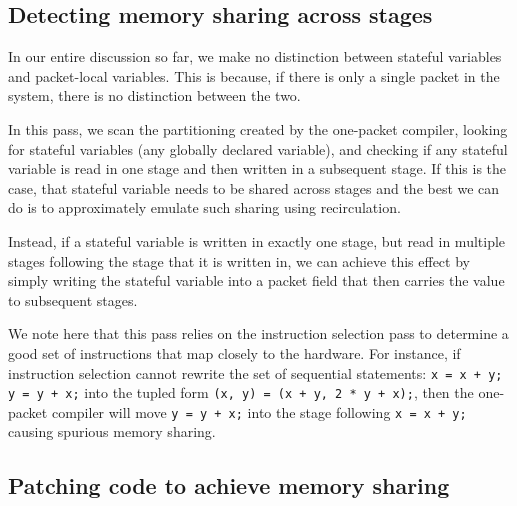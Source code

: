 
\subsection{Detecting memory sharing across stages}
In our entire discussion so far, we make no distinction between stateful
variables and packet-local variables. This is because, if there is only a
single packet in the system, there is no distinction between the two.

In this pass, we scan the partitioning created by the one-packet compiler,
looking for stateful variables (any globally declared variable), and checking
if any stateful variable is read in one stage and then written in a subsequent
stage. If this is the case, that stateful variable needs to be shared across
stages and the best we can do is to approximately emulate such sharing using
recirculation.

Instead, if a stateful variable is written in exactly one stage, but read in
multiple stages following the stage that it is written in, we can achieve this
effect by simply writing the stateful variable into a packet field that then
carries the value to subsequent stages.

We note here that this pass relies on the instruction selection pass to
determine a good set of instructions that map closely to the hardware. For
instance, if instruction selection cannot rewrite the set of sequential
statements: \texttt{x = x + y; y = y + x;} into the tupled form \texttt{(x, y)
= (x + y, 2 * y + x);}, then the one-packet compiler will move \texttt{y = y +
x;} into the stage following \texttt{x = x + y;} causing spurious memory
sharing.

\subsection{Patching code to achieve memory sharing}

